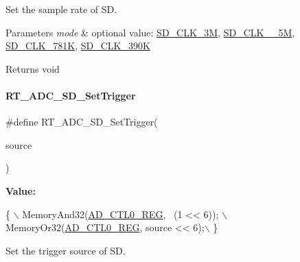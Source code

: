 Set the sample rate of SD. 


\begin{DoxyParams}{Parameters}
{\em mode} & optional value\+: \mbox{\hyperlink{a00002_aebc3424fa91b715741f0320561ecfbb0a720c5991be73063f5ab035440f26b486}{S\+D\+\_\+\+C\+L\+K\+\_\+3M}}, \mbox{\hyperlink{a00002_aebc3424fa91b715741f0320561ecfbb0a5241c8457df3f987f10797b36db20771}{S\+D\+\_\+\+C\+L\+K\+\_\+\_\+5M}}, \mbox{\hyperlink{a00002_aebc3424fa91b715741f0320561ecfbb0a37bbada3115f676b49cc087c5caac0d3}{S\+D\+\_\+\+C\+L\+K\+\_\+781K}}, \mbox{\hyperlink{a00002_aebc3424fa91b715741f0320561ecfbb0ace583ebd6e97c856a883187711ea4226}{S\+D\+\_\+\+C\+L\+K\+\_\+390K}} \\
\hline
\end{DoxyParams}
\begin{DoxyReturn}{Returns}
void 
\end{DoxyReturn}
\mbox{\label{a00002_a11bf38478bd196acd1f179115e714dfc}} 
\paragraph{\texorpdfstring{R\+T\+\_\+\+A\+D\+C\+\_\+\+S\+D\+\_\+\+Set\+Trigger}{RT\_ADC\_SD\_SetTrigger}}
{\footnotesize\ttfamily \#define R\+T\+\_\+\+A\+D\+C\+\_\+\+S\+D\+\_\+\+Set\+Trigger(\begin{DoxyParamCaption}\item[{}]{source }\end{DoxyParamCaption})}

{\bfseries Value\+:}
\begin{DoxyCode}
\{                                        \(\backslash\)
        MemoryAnd32(\mbox{\hyperlink{a00020_adadaa0ab1ebbd7ba9b70dfd24c3ed44da479497b755dee411ad6348cae2ef26b4}{AD\_CTL0\_REG}}, ~(1 << 6)); \(\backslash\)
        MemoryOr32(\mbox{\hyperlink{a00020_adadaa0ab1ebbd7ba9b70dfd24c3ed44da479497b755dee411ad6348cae2ef26b4}{AD\_CTL0\_REG}}, source << 6);\(\backslash\)
    \}
\end{DoxyCode}


Set the trigger source of SD. 


